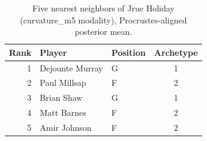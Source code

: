 \begin{table}[htbp]
  \centering\small
  \begin{tabular}{rllc}
    \toprule
    Rank & Player & Position & Archetype \\
    \midrule
    1 & Dejounte Murray & G & 1 \\
    2 & Paul Millsap & F & 2 \\
    3 & Brian Shaw & G & 1 \\
    4 & Matt Barnes & F & 2 \\
    5 & Amir Johnson & F & 2 \\
    \bottomrule
  \end{tabular}
  \caption{Five nearest neighbors of Jrue Holiday (curvature_m5 modality), Procrustes-aligned posterior mean.}
  \label{tab:Jrue_Holiday_neighbors_curvature_m5}
\end{table}

